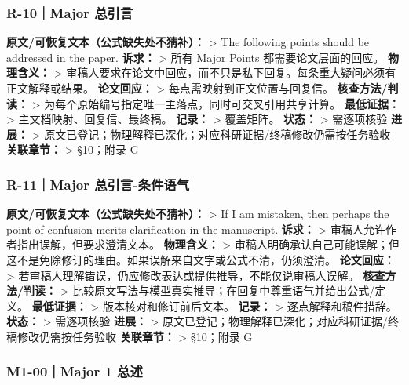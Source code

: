 \documentclass[
]{article}
\begin{document}
\subsubsection{R-10｜Major 总引言}\label{r-10major-ux603bux5f15ux8a00}

\textbf{原文/可恢复文本（公式缺失处不猜补）：} \textgreater{} The
following points should be addressed in the paper. \textbf{诉求：}
\textgreater{} 所有 Major Points 都需要论文层面的回应。
\textbf{物理含义：} \textgreater{}
审稿人要求在论文中回应，而不只是私下回复。每条重大疑问必须有正文解释或结果。
\textbf{论文回应：} \textgreater{} 每点需映射到正文位置与回复信。
\textbf{核查方法/判读：} \textgreater{}
为每个原始编号指定唯一主落点，同时可交叉引用共享计算。
\textbf{最低证据：} \textgreater{} 主文档映射、回复信、最终稿。
\textbf{记录：} \textgreater{} 覆盖矩阵。 \textbf{状态：} \textgreater{}
需逐项核验 \textbf{进展：} \textgreater{}
原文已登记；物理解释已深化；对应科研证据/终稿修改仍需按任务验收
\textbf{关联章节：} \textgreater{} §10；附录 G

\subsubsection{R-11｜Major
总引言-条件语气}\label{r-11major-ux603bux5f15ux8a00-ux6761ux4ef6ux8bedux6c14}

\textbf{原文/可恢复文本（公式缺失处不猜补）：} \textgreater{} If I am
mistaken, then perhaps the point of confusion merits clarification in
the manuscript. \textbf{诉求：} \textgreater{}
审稿人允许作者指出误解，但要求澄清文本。 \textbf{物理含义：}
\textgreater{}
审稿人明确承认自己可能误解；但这不是免除修订的理由。如果误解来自文字或公式不清，仍须澄清。
\textbf{论文回应：} \textgreater{}
若审稿人理解错误，仍应修改表达或提供推导，不能仅说审稿人误解。
\textbf{核查方法/判读：} \textgreater{}
比较原文写法与模型真实推导；在回复中尊重语气并给出公式/定义。
\textbf{最低证据：} \textgreater{} 版本核对和修订前后文本。
\textbf{记录：} \textgreater{} 逐点解释和稿件措辞。 \textbf{状态：}
\textgreater{} 需逐项核验 \textbf{进展：} \textgreater{}
原文已登记；物理解释已深化；对应科研证据/终稿修改仍需按任务验收
\textbf{关联章节：} \textgreater{} §10；附录 G

\subsubsection{M1-00｜Major 1 总述}\label{m1-00major-1-ux603bux8ff0}
\end{document}
